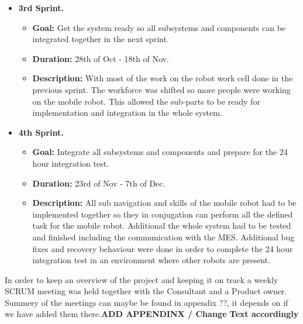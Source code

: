 \begin{itemize}
    \item \textbf{3rd Sprint.}
    \begin{itemize}
    	\item \textbf{Goal:} Get the system ready so all subsystems and components can be integrated together in the next sprint.
    	\item \textbf{Duration:} 28th of Oct - 18th of Nov.
    	\item \textbf{Description:} With most of the work on the robot work cell done in the previous sprint. The workforce was shifted so more people were working on the mobile robot. This allowed the sub-parts to be ready for implementation and integration in the whole system.
	\end{itemize}
	
    \item \textbf{4th Sprint.}
    \begin{itemize}
    	\item \textbf{Goal:} Integrate all subsystems and components and prepare for the 24 hour integration test.
    	\item \textbf{Duration:} 23rd of Nov - 7th of Dec.
    	\item \textbf{Description:} All sub navigation and skills of the mobile robot had to be implemented together so they in conjugation can perform all the defined task for the mobile robot. Additional the whole system had to be tested and finished including the communication with the MES. Additional bug fixes and recovery behaviour were done in order to complete the 24 hour integration test in an environment where other robots are present.
	\end{itemize}
\end{itemize}

In order to keep an overview of the project and keeping it on track a weekly SCRUM meeting was held together with the Consultant and a Product owner. Summery of the meetings can maybe be found in appendix ??, it depends on if we have added them there.\textbf{ADD APPENDINX / Change Text accordingly}